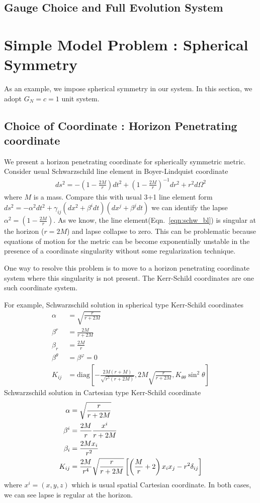 \documentclass[a4paper,oneside,openany,11pt]{memoir}
\numberwithin{equation}{section} %
\begin{document}
\subsection{Gauge Choice and Full Evolution System}

\section{Simple Model Problem : Spherical Symmetry}
As an example, we impose spherical symmetry in our system. In this section, we adopt $G_N = c = 1$ unit system.
\subsection{Choice of Coordinate : Horizon Penetrating coordinate}
We present a horizon penetrating coordinate for spherically symmetric metric. Consider usual Schwarzschild line element in Boyer-Lindquist coordinate 
\begin{align}
\label{eqn:schw_bl}
ds^2 = - \left(1- \frac{2M}{r} \right) dt^2 + \left(1- \frac{2M}{r} \right)^{-1} dr^2 + r^2 d\Omega^2 
\end{align}
where $M$ is a mass. Compare this with usual 3+1 line element form $ds^2 = - \alpha^2 dt^2 + \gamma_{ij} ( dx^2 + \beta^i dt)(dx^j + \beta^j dt)$ we can identify the lapse $\alpha^2 = \left(1- \frac{2M}{r} \right)$. As we know, the line element(Eqn.~\ref{eqn:schw_bl}) is singular at the horizon ($r=2M$) and lapse collapse to zero. This can be problematic because equations of motion for the metric can be become exponentially unstable in the presence of a coordinate singularity without some regularization technique.

One way to resolve this problem is to move to a horizon penetrating coordinate system where this singularity is not present. The Kerr-Schild coordinates are one such coordinate system. 

For example, Schwarzschild solution in spherical type Kerr-Schild coordinates
\begin{align}
\alpha &= \sqrt{\frac{r}{r+2M}} \\
\beta^r &= \frac{2M}{r+2M} \\
\beta_r &=\frac{2M}{r} \\
\beta^\theta &= \beta^\varphi = 0 \\
K_{ij} &= \textrm{diag} \left[ -\frac{2M(r+M)}{\sqrt{r^5 (r+2M)}} , 2M \sqrt{\frac{r}{r+2M}}, K_{\theta \theta} \sin^2 \theta \right]
\end{align}
Schwarzschild solution in Cartesian type Kerr-Schild coordinate
\begin{align}
\alpha &= \sqrt{\frac{r}{r+2M}} \\
\beta^i &= \frac{2M}{r} \frac{x^i}{r+2M} \\
\beta_i &=\frac{2M x_i}{r^2} \\
K_{ij} &= \-\frac{2M}{r^4} \sqrt{\frac{r}{r+2M}} \left[ \left( \frac{M}{r}+2 \right) x_i x_j - r^2 \delta_{ij} \right]
\end{align}
where $x^i = (x,y,z)$ which is usual spatial Cartesian coordinate. In both cases, we can see lapse is regular at the horizon.
\end{document}
